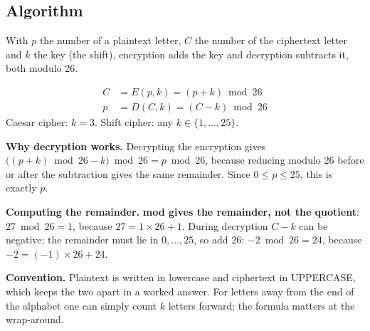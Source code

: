 \subsection{Algorithm}
With $p$ the number of a plaintext letter, $C$ the number of the ciphertext letter and $k$ the key (the shift), encryption adds the key and decryption subtracts it, both modulo 26.
\begin{mustknow}
\vspace{-6pt}
\begin{align*}
C &= E(p,k) = (p + k) \bmod 26\\
p &= D(C,k) = (C - k) \bmod 26
\end{align*}
Caesar cipher: $k = 3$. Shift cipher: any $k \in \{1, \dots, 25\}$.
\end{mustknow}

\begin{minipage}[c]{0.55\textwidth}
\textbf{Why decryption works.} Decrypting the encryption gives $\big((p + k) \bmod 26 - k\big) \bmod 26 = p \bmod 26$, because reducing modulo 26 before or after the subtraction gives the same remainder. Since $0 \le p \le 25$, this is exactly $p$.

\textbf{Computing the remainder.} \textbf{mod gives the remainder, not the quotient}: $27 \bmod 26 = 1$, because $27 = 1 \times 26 + 1$. During decryption $C - k$ can be negative; the remainder must lie in $0, \dots, 25$, so add 26: $-2 \bmod 26 = 24$, because $-2 = (-1) \times 26 + 24$.

\textbf{Convention.} Plaintext is written in lowercase and ciphertext in UPPERCASE, which keeps the two apart in a worked answer. For letters away from the end of the alphabet one can simply count $k$ letters forward; the formula matters at the wrap-around.
\end{minipage}\hfill
\begin{minipage}[c]{0.42\textwidth}
\centering
{}
\end{minipage}

